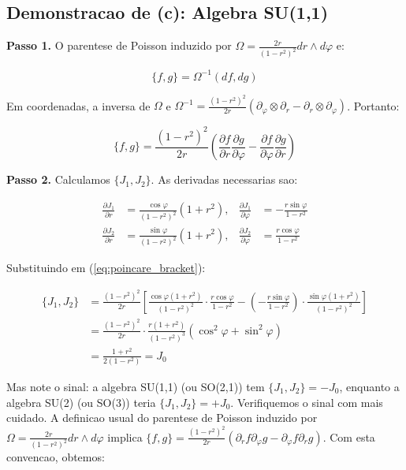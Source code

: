 \documentclass[12pt,a4paper,oneside]{article}
\begin{document}
\subsection*{Demonstracao de (c): Algebra SU(1,1)}

\textbf{Passo 1.} O parentese de Poisson induzido por
$\Omega = \frac{2r}{(1-r^2)^2} dr \wedge d\varphi$ e:

$$\{f, g\} = \Omega^{-1}(df, dg)$$

Em coordenadas, a inversa de $\Omega$ e $\Omega^{-1} =
\frac{(1-r^2)^2}{2r}(\partial_\varphi \otimes \partial_r -
\partial_r \otimes \partial_\varphi)$. Portanto:

\begin{equation}\label{eq:poincare_bracket}
\{f, g\} = \frac{(1-r^2)^2}{2r}\left(
\frac{\partial f}{\partial r}\frac{\partial g}{\partial\varphi} -
\frac{\partial f}{\partial\varphi}\frac{\partial g}{\partial r}
\right)
\end{equation}

\textbf{Passo 2.} Calculamos $\{J_1, J_2\}$. As derivadas necessarias sao:

\begin{align*}
\frac{\partial J_1}{\partial r} &= \frac{\cos\varphi}{(1-r^2)^2}(1+r^2), &
\frac{\partial J_1}{\partial\varphi} &= -\frac{r\sin\varphi}{1-r^2} \\
\frac{\partial J_2}{\partial r} &= \frac{\sin\varphi}{(1-r^2)^2}(1+r^2), &
\frac{\partial J_2}{\partial\varphi} &= \frac{r\cos\varphi}{1-r^2}
\end{align*}

Substituindo em (\ref{eq:poincare_bracket}):

\begin{align*}
\{J_1, J_2\} &= \frac{(1-r^2)^2}{2r}\left[
\frac{\cos\varphi(1+r^2)}{(1-r^2)^2} \cdot \frac{r\cos\varphi}{1-r^2} -
\left(-\frac{r\sin\varphi}{1-r^2}\right) \cdot \frac{\sin\varphi(1+r^2)}{(1-r^2)^2}
\right] \\
&= \frac{(1-r^2)^2}{2r} \cdot \frac{r(1+r^2)}{(1-r^2)^3}(\cos^2\varphi + \sin^2\varphi) \\
&= \frac{1+r^2}{2(1-r^2)} = J_0
\end{align*}

Mas note o sinal: a algebra SU(1,1) (ou SO(2,1)) tem $\{J_1,J_2\} = -J_0$,
enquanto a algebra SU(2) (ou SO(3)) teria $\{J_1,J_2\} = +J_0$. Verifiquemos
o sinal com mais cuidado. A definicao usual do parentese de Poisson induzido
por $\Omega = \frac{2r}{(1-r^2)^2}dr\wedge d\varphi$ implica
$\{f,g\} = \frac{(1-r^2)^2}{2r}(\partial_r f \partial_\varphi g -
\partial_\varphi f \partial_r g)$. Com esta convencao, obtemos:
\end{document}
